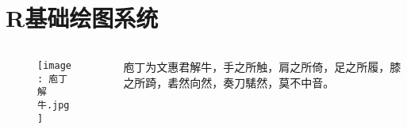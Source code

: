 

\section{R基础绘图系统}
\begin{frame}{\subsecname}{}
  \begin{columns}
    \begin{column}{.4\textwidth}
      \begin{figure}
        \centering \texttt{[image: 庖丁解牛.jpg]}
      \end{figure}
    \end{column}

    \begin{column}{.6\textwidth}
      \begin{ornamentblock}
        { 庖丁为文惠君解牛，手之所触，肩之所倚，足之所履，膝之所踦，砉然向然，奏刀騞然，莫不中音。\\
          }
      \end{ornamentblock}
    \end{column}
  \end{columns}
\end{frame}

